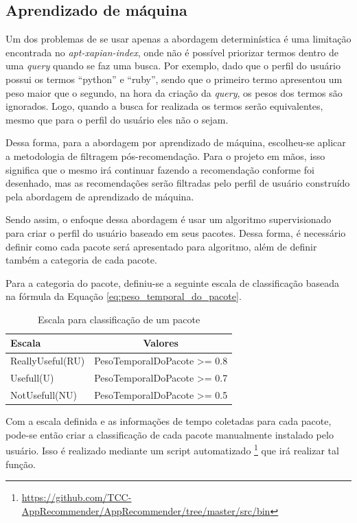 \subsection{Aprendizado de máquina}

Um dos problemas de se usar apenas a abordagem determinística é uma limitação
encontrada no \textit{apt-xapian-index}, onde não é possível priorizar termos
dentro de uma \textit{query} quando se faz uma busca. Por exemplo, dado que o perfil
do usuário possui os termos ``python'' e ``ruby'', sendo que o primeiro termo
apresentou um peso maior que o segundo, na hora da criação da \textit{query}, os pesos
dos termos são ignorados. Logo, quando a busca for realizada os termos serão
equivalentes, mesmo que para o perfil do usuário eles não o sejam.

Dessa forma, para a abordagem por aprendizado de máquina, escolheu-se aplicar a
metodologia de filtragem pós-recomendação. Para o projeto em mãos, isso
significa que o mesmo irá continuar fazendo a recomendação conforme foi
desenhado, mas as recomendações serão filtradas pelo perfil de usuário
construído pela abordagem de aprendizado de máquina.

Sendo assim, o enfoque dessa abordagem é usar um algoritmo supervisionado
para criar o perfil do usuário baseado em seus pacotes. Dessa forma, é
necessário definir como cada pacote será apresentado para algoritmo, além de
definir também a categoria de cada pacote.

Para a categoria do pacote, definiu-se a seguinte escala de classificação
baseada na fórmula da Equação \ref{eq:peso_temporal_do_pacote}.

\begin{table}[h]
\centering
\caption{Escala para classificação de um pacote}
\begin{tabular}{lc}
\hline
\rowcolor[HTML]{EFEFEF}
{Escala} & {Valores} \\ \hline
{ReallyUseful(RU)}  & PesoTemporalDoPacote >= 0.8                  \\ \hline
{Usefull(U)}   & PesoTemporalDoPacote >= 0.7                       \\ \hline
{NotUsefull(NU)}   & PesoTemporalDoPacote >= 0.5                   \\ \hline
\end{tabular}
\label{tab:classificacao_pacotes}
\end{table}


Com a escala definida e as informações de tempo coletadas para cada pacote,
pode-se então criar a classificação de cada pacote manualmente instalado pelo
usuário.
Isso é realizado mediante um script automatizado \footnote{\url{https://github.com/TCC-AppRecommender/AppRecommender/tree/master/src/bin}}
que irá realizar tal função.

